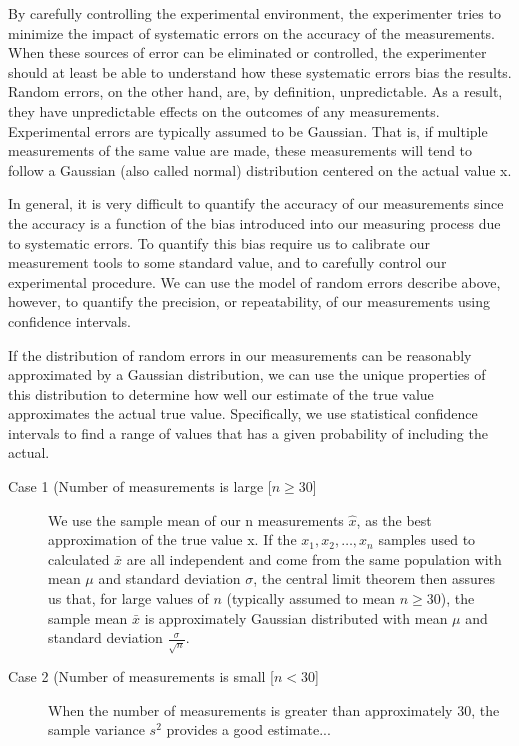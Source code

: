 \documentclass[openany, a4paper]{book}
\theoremstyle{break}
\theoremstyle{example}
\theoremstyle{note}
\theoremstyle{break}
\theoremstyle{exercise}
\begin{document}
By carefully controlling the experimental environment, the experimenter
tries to minimize the impact of systematic errors on the accuracy of the
measurements. When these sources of error can be eliminated or controlled,
the experimenter should at least be able to understand how these systematic
errors bias the results. Random errors, on the other hand, are, by
definition, unpredictable. As a result, they have unpredictable effects on
the outcomes of any measurements. Experimental errors are typically assumed
to be Gaussian. That is, if multiple measurements of the same value are
made, these measurements will tend to follow a Gaussian (also called normal)
distribution centered on the actual value x.

In general, it is very difficult to quantify the accuracy of our
measurements since the accuracy is a function of the bias introduced into
our measuring process due to systematic errors. To quantify this bias
require us to calibrate our measurement tools to some standard value, and to
carefully control our experimental procedure. We can use the model of
random errors describe above, however, to quantify the precision, or
repeatability, of our measurements using confidence intervals.

If the distribution of random errors in our measurements can be reasonably
approximated by a Gaussian distribution, we can use the unique properties of
this distribution to determine how well our estimate of the true value
approximates the actual true value. Specifically, we use statistical
confidence intervals to find a range of values that has a given probability
of including the actual.

\begin{description}
\item[{Case 1 (Number of measurements is large [\(n \ge 30\)]}] We use the
sample mean of our n measurements \(\hat{x}\), as the best approximation
of the true value x. If the \(x_1, x_2, \ldots, x_n\) samples used to
calculated \(\bar{x}\) are all independent and come from the same
population with mean \(\mu\) and standard deviation \(\sigma\), the
central limit theorem then assures us that, for large values of \(n\)
(typically assumed to mean \(n \ge 30\)), the sample mean \(\bar{x}\) is
approximately Gaussian distributed with mean \(\mu\) and standard
deviation \(\frac{\sigma}{\sqrt{n}}\).

\item[{Case 2 (Number of measurements is small [\(n < 30\)]}] When the number of
measurements is greater than approximately 30, the sample variance \(s^2\)
provides a good estimate...
\end{description}
\end{document}

